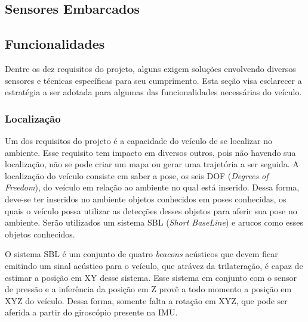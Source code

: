\subsection{Sensores Embarcados}
\label{subsec:sensores-embarcados}

\subsection{Funcionalidades}
\label{subsec:funcionalidades}
Dentre os dez requisitos do projeto, alguns exigem soluções envolvendo diversos sensores e técnicas específicas para seu cumprimento. Esta seção visa esclarecer a estratégia a ser adotada para algumas das funcionalidades necessárias do veículo.

\subsubsection{Localização}
\label{subsec:localizacao}

Um dos requisitos do projeto é a capacidade do veículo de se localizar no ambiente. Esse requisito tem impacto em diversos outros, pois não havendo sua localização, não se pode criar um mapa ou gerar uma trajetória a ser seguida. A localização do veículo consiste em saber a pose, os seis DOF (\textit{Degrees of Freedom}), do veículo em relação ao ambiente no qual está inserido. Dessa forma, deve-se ter inseridos no ambiente objetos conhecidos em poses conhecidas, os quais o veículo possa utilizar as detecções desses objetos para aferir sua pose no ambiente. Serão utilizados um sistema SBL (\textit{Short BaseLine}) e arucos como esses objetos conhecidos.

O sistema SBL é um conjunto de quatro \textit{beacons} acústicos que devem ficar emitindo um sinal acústico para o veículo, que atrávez da trilateração, é capaz de estimar a posição em XY desse sistema. Esse sistema em conjunto com o sensor de pressão e a inferência da posição em Z provê a todo momento a posição em XYZ do veículo. Dessa forma, somente falta a rotação em XYZ, que pode ser aferida a partir do giroscópio presente na IMU.

